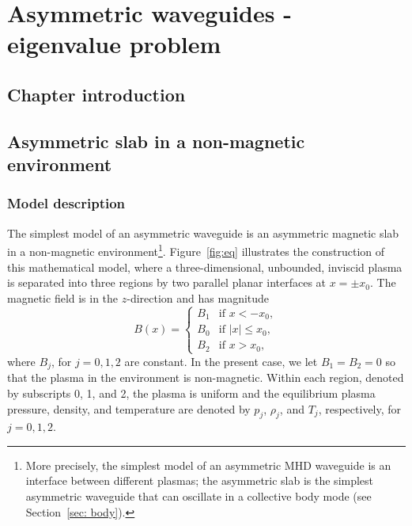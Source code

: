 \documentclass[12pt]{../style-files/ociamthesis}
\begin{document}
\baselineskip=18pt

\setcounter{secnumdepth}{3}
\setcounter{tocdepth}{3}

\setcounter{chapter}{1}


\chapter{Asymmetric waveguides - eigenvalue problem}
\label{chap: EVP}

\section{Chapter introduction}
\label{sec: EVP intro}



\section{Asymmetric slab in a non-magnetic environment}
\label{sec: EVP non-mag}

\subsection{Model description}
The simplest model of an asymmetric waveguide is an asymmetric magnetic slab in a non-magnetic environment\footnote{More precisely, the simplest model of an asymmetric MHD waveguide is an interface between different plasmas; the asymmetric slab is the simplest asymmetric waveguide that can oscillate in a collective body mode (see Section~\ref{sec: body}).}. Figure~\ref{fig:eq} illustrates the construction of this mathematical model, where a three-dimensional, unbounded, inviscid plasma is separated into three regions by two parallel planar interfaces at $x = \pm x_0$. The magnetic field is in the $z$-direction and has magnitude
\begin{equation}
	B(x)=
	\begin{cases}
		B_1 & \text{if } x < -x_0, \\
		B_0 & \text{if } |x|\leq{x_0}, \\
		B_2 & \text{if } x > x_0,
	\end{cases}
\end{equation}
where $B_j$, for $j = 0, 1, 2$ are constant. In the present case, we let $B_1 = B_2 = 0$ so that the plasma in the environment is non-magnetic. Within each region, denoted by subscripts 0, 1, and 2, the plasma is uniform and the equilibrium plasma pressure, density, and temperature are denoted by $p_j$, $\rho_j$, and $T_j$, respectively, for $j = 0, 1, 2$.
\end{document}
